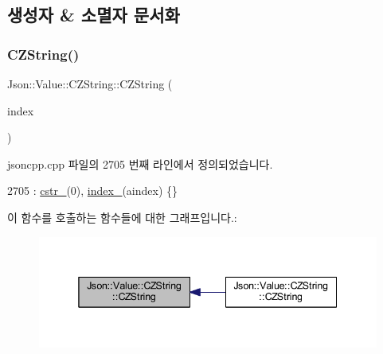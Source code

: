 \subsection{생성자 \& 소멸자 문서화}
\mbox{\label{class_json_1_1_value_1_1_c_z_string_a4b8aa6eaabdec78cffec96e088da996f}} 
\subsubsection{\texorpdfstring{C\+Z\+String()}{CZString()}\hspace{0.1cm}{\footnotesize\ttfamily [1/3]}}
{\footnotesize\ttfamily Json\+::\+Value\+::\+C\+Z\+String\+::\+C\+Z\+String (\begin{DoxyParamCaption}\item[{\hyperlink{class_json_1_1_value_a184a91566cccca7b819240f0d5561c7d}{Array\+Index}}]{index }\end{DoxyParamCaption})}



jsoncpp.\+cpp 파일의 2705 번째 라인에서 정의되었습니다.


\begin{DoxyCode}
2705 : \hyperlink{class_json_1_1_value_1_1_c_z_string_a5b4d28349294034d7f779c3c95d0306c}{cstr\_}(0), \hyperlink{class_json_1_1_value_1_1_c_z_string_aecf29982235c9c165a0971023ebbb270}{index\_}(aindex) \{\}
\end{DoxyCode}
이 함수를 호출하는 함수들에 대한 그래프입니다.\+:\nopagebreak
\begin{figure}[H]
\begin{center}
\leavevmode
\includegraphics[width=338pt]{class_json_1_1_value_1_1_c_z_string_a4b8aa6eaabdec78cffec96e088da996f_icgraph}
\end{center}
\end{figure}
\mbox{\label{class_json_1_1_value_1_1_c_z_string_a86a86eaf0cf26d4c861d0daa359d608a}} 
